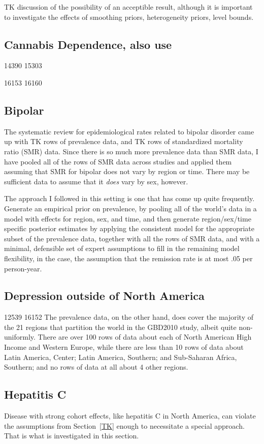 TK discussion of the possibility of an acceptible result, although it
is important to investigate the effects of smoothing priors,
heterogeneity priors, level bounds.

\subsection{Cannabis Dependence, also use}
14390 15303 

16153 16160 

\subsection{Bipolar}
The systematic review for epidemiological rates related to bipolar
disorder came up with TK rows of prevalence data, and TK rows of
standardized mortality ratio (SMR) data.  Since there is so much more
prevalence data than SMR data, I have pooled all of the rows of SMR
data across studies and applied them assuming that SMR for bipolar
does not vary by region or time.  There may be sufficient data to assume
that it \emph{does} vary by sex, however. 

The approach I followed in this setting is one that has come up quite
frequently.  Generate an empirical prior on prevalence, by pooling all
of the world's data in a model with effects for region, sex, and
time, and then generate region/sex/time specific posterior estimates
by applying the consistent model for the appropriate subset of the
prevalence data, together with all the rows of SMR data, and with a
minimal, defensible set of expert assumptions to fill in the remaining
model flexibility, in the case, the assumption that the remission rate
is at most .05 per person-year.

\subsection{Depression outside of North America}
12539 
16152
 The prevalence data, on the
other hand, does cover the majority of the 21 regions that partition
the world in the GBD2010 study, albeit quite non-uniformly.  There are
over 100 rows of data about each of North American High Income and
Western Europe, while there are less than 10 rows of data about Latin
America, Center; Latin America, Southern; and Sub-Saharan Africa,
Southern; and no rows of data at all about 4 other regions.

\subsection{Hepatitis C}
Disease with strong cohort effects, like hepatitis C in North America,
can violate the assumptions from Section~\ref{TK} enough to
necessitate a special approach.  That is what is investigated in this
section.

